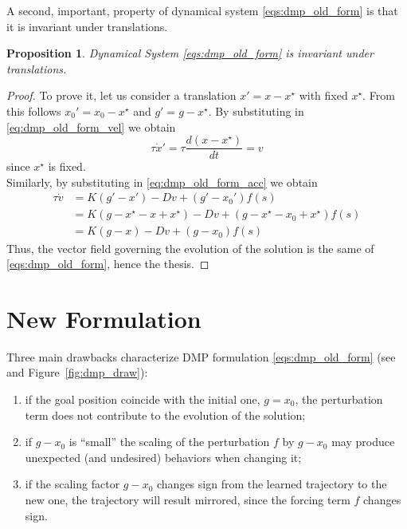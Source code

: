\documentclass[fleqn, 11pt]{article}
\theoremstyle{definition}
\theoremstyle{plain}
\newtheorem{prop}{Proposition}[section]
\theoremstyle{remark}
\begin{document}
A second, important, property of dynamical system \eqref{eqs:dmp_old_form} is that it is invariant under translations.

\begin{prop}\label{prop:old_dmp_transl_inv}
    Dynamical System \eqref{eqs:dmp_old_form} is invariant under translations.
\end{prop}
\begin{proof}
    To prove it, let us consider a translation \( x' = x - x^\star \) with fixed $ x^\star $.
    From this follows $ x_0' = x_0 - x^\star $ and $ g' = g - x^\star $.
    By substituting in \eqref{eq:dmp_old_form_vel} we obtain
    \[ \tau \dot{x}' = \tau \frac{d\! (x - x^\star)}{d\! t} = v \]
    since $ x^\star $ is fixed.\\
    Similarly, by substituting in \eqref{eq:dmp_old_form_acc} we obtain
    \begin{align*}
        \tau \dot{v} & = K ( g' - x' ) - Dv + (g' - x_0 ' ) f(s) \\
        & = K ( g - x^\star - x + x^\star ) - Dv + (g - x^\star - x_0 + x^\star ) f(s) \\
        & = K ( g - x ) - Dv + (g - x_0 ) f(s)
    \end{align*}
    Thus, the vector field governing the evolution of the solution is the same of \eqref{eqs:dmp_old_form}, hence the thesis.
\end{proof}

\section{New Formulation}

Three main drawbacks characterize DMP formulation \eqref{eqs:dmp_old_form} (see \cite{PHAS09} and Figure~\ref{fig:dmp_draw}):
\begin{enumerate}
    \item if the goal position coincide with the initial one, $g = x_0$, the perturbation term does not contribute to the evolution of the solution;
    \item if $g - x_0$ is ``small'' the scaling of the perturbation $f$ by $g - x_0$ may produce unexpected (and undesired) behaviors when changing it;
    \item if the scaling factor $ g - x_0 $ changes sign from the learned trajectory to the new one, the trajectory will result mirrored, since the forcing term $f$ changes sign.
\end{enumerate}
\end{document}
